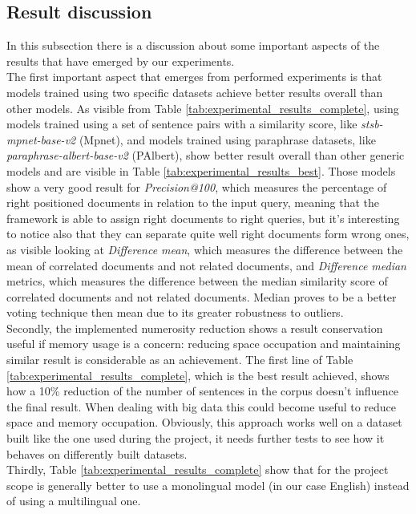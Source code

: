 \documentclass[\main/main.tex]{subfiles}
\begin{document}
\subsection{Result discussion}
In this subsection there is a discussion about some important aspects of the results that have emerged by our experiments. \\
The first important aspect that emerges from performed experiments is that models trained using two specific datasets achieve better results overall than other models. As visible from Table \ref{tab:experimental_results_complete}, using models trained using a set of sentence pairs with a similarity score, like \emph{stsb-mpnet-base-v2} (Mpnet), and models trained using paraphrase datasets, like \emph{paraphrase-albert-base-v2} (PAlbert), show better result overall than other generic models and are visible in Table \ref{tab:experimental_results_best}. Those models show a very good result for \emph{Precision@100}, which measures the percentage of right positioned documents in relation to the input query, meaning that the framework is able to assign right documents to right queries, but it's interesting to notice also that they can separate quite well right documents form wrong ones, as visible looking at \emph{Difference mean}, which measures the difference between the mean of correlated documents and not related documents, and \emph{Difference median} metrics, which measures the difference between the median similarity score of correlated documents and not related documents. Median proves to be a better voting technique then mean due to its greater robustness to outliers.\\
Secondly, the implemented numerosity reduction shows a result conservation useful if memory usage is a concern: reducing space occupation and maintaining similar result is considerable as an achievement. The first line of Table \ref{tab:experimental_results_complete}, which is the best result achieved, shows how a 10\% reduction of the number of sentences in the corpus doesn't influence the final result. When dealing with big data this could become useful to reduce space and memory occupation. Obviously, this approach works well on a dataset built like the one used during the project, it needs further tests to see how it behaves on differently built datasets.\\
Thirdly, Table \ref{tab:experimental_results_complete} show that for the project scope is generally better to use a monolingual model (in our case English) instead of using a multilingual one.\\
\end{document}
